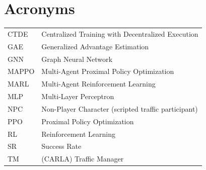 \documentclass[12pt,a4paper,oneside]{report}
\begin{document}
\chapter*{Acronyms}
\begin{tabular}{ll}
CTDE  & Centralized Training with Decentralized Execution \\
GAE   & Generalized Advantage Estimation \\
GNN   & Graph Neural Network \\
MAPPO & Multi-Agent Proximal Policy Optimization \\
MARL  & Multi-Agent Reinforcement Learning \\
MLP   & Multi-Layer Perceptron \\
NPC   & Non-Player Character (scripted traffic participant) \\
PPO   & Proximal Policy Optimization \\
RL    & Reinforcement Learning \\
SR    & Success Rate \\
TM    & (CARLA) Traffic Manager \\
\end{tabular}

\clearpage
{}








\appendix


\printbibliography[heading=bibintoc]
\end{document}
